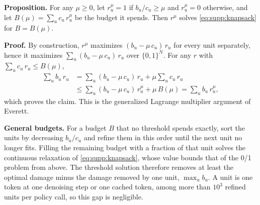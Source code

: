 \noindent\textbf{Proposition.}
For any $\mu \ge 0$, let $r^\mu_u = 1$ if $b_u / c_u \ge \mu$ and $r^\mu_u = 0$ otherwise, and let $B(\mu) = \sum_u c_u\, r^\mu_u$ be the budget it spends.
Then $r^\mu$ solves \cref{eq:supp:knapsack} for $B = B(\mu)$.

\noindent\textbf{Proof.}
By construction, $r^\mu$ maximizes $(b_u - \mu\, c_u)\, r_u$ for every unit separately, hence it maximizes $\sum_u (b_u - \mu\, c_u)\, r_u$ over $\{0,1\}^N$.
For any $r$ with $\sum_u c_u\, r_u \le B(\mu)$,
\begin{align}
  \sum_u b_u\, r_u
    &= \sum_u (b_u - \mu\, c_u)\, r_u + \mu \sum_u c_u\, r_u \nonumber\\
    &\le \sum_u (b_u - \mu\, c_u)\, r^\mu_u + \mu\, B(\mu) = \sum_u b_u\, r^\mu_u ,
\end{align}
which proves the claim.
This is the generalized Lagrange multiplier argument of Everett.

\noindent\textbf{General budgets.}
For a budget $B$ that no threshold spends exactly, sort the units by decreasing $b_u / c_u$ and refine them in this order until the next unit no longer fits.
Filling the remaining budget with a fraction of that unit solves the continuous relaxation of \cref{eq:supp:knapsack}, whose value bounds that of the 0/1 problem from above.
The threshold solution therefore removes at least the optimal damage minus the damage removed by one unit, $\max_u b_u$.
A unit is one token at one denoising step or one cached token, among more than $10^3$ refined units per policy call, so this gap is negligible.

